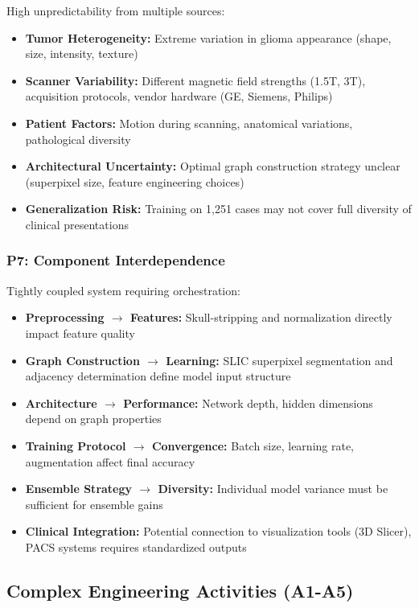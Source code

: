 High unpredictability from multiple sources:

\begin{itemize}
    \item \textbf{Tumor Heterogeneity:} Extreme variation in glioma appearance (shape, size, intensity, texture)
    \item \textbf{Scanner Variability:} Different magnetic field strengths (1.5T, 3T), acquisition protocols, vendor hardware (GE, Siemens, Philips)
    \item \textbf{Patient Factors:} Motion during scanning, anatomical variations, pathological diversity
    \item \textbf{Architectural Uncertainty:} Optimal graph construction strategy unclear (superpixel size, feature engineering choices)
    \item \textbf{Generalization Risk:} Training on 1,251 cases may not cover full diversity of clinical presentations
\end{itemize}

\subsubsection*{P7: Component Interdependence}

Tightly coupled system requiring orchestration:

\begin{itemize}
    \item \textbf{Preprocessing $\rightarrow$ Features:} Skull-stripping and normalization directly impact feature quality
    \item \textbf{Graph Construction $\rightarrow$ Learning:} SLIC superpixel segmentation and adjacency determination define model input structure
    \item \textbf{Architecture $\rightarrow$ Performance:} Network depth, hidden dimensions depend on graph properties
    \item \textbf{Training Protocol $\rightarrow$ Convergence:} Batch size, learning rate, augmentation affect final accuracy
    \item \textbf{Ensemble Strategy $\rightarrow$ Diversity:} Individual model variance must be sufficient for ensemble gains
    \item \textbf{Clinical Integration:} Potential connection to visualization tools (3D Slicer), PACS systems requires standardized outputs
\end{itemize}

\subsection*{Complex Engineering Activities (A1-A5)}

